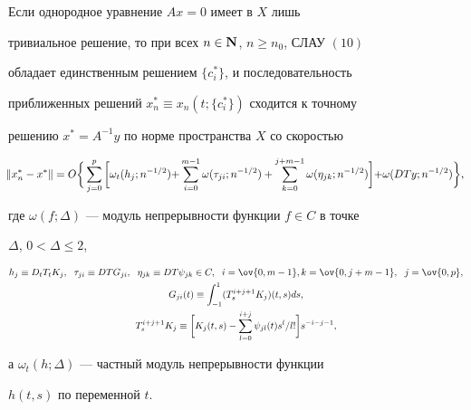 \begin{thm} 


Если однородное уравнение $Ax=0$ имеет в $X$ лишь 


тривиальное решение, то при всех $n\in\bold N$, $n\ge n_0$, СЛАУ $(10)$ 


обладает единственным решением $\{c^*_i\}$, и последовательность 


приближенных решений $x^*_n\equiv x_n(t;\{c^*_i\})$ сходится к точному 


решению $x^*=A^{-1}y$ по норме пространства $X$ со скоростью 


\begin{equation} 


\negthickspace\|x^*_n-x^*\|=


O\bigg\{\sum^p_{j=0}\bigg[\omega_t(h_j;n^{-1/2}){+} 


\sum^{m-1}_{i=0}\omega(\tau_{j i};n^{-1/2})+\sum^{j+m-1}_{k=0} 


\omega(\eta_{j k};n^{-1/2})\bigg]{+}\omega(D T y;n^{-1/2})\bigg\}, 


\end{equation} 


где $\omega(f;\Delta)$ --- модуль непрерывности функции $f\in C$ в точке 


$\Delta$, $0<\Delta\le2$, 


\begin{gather*} 


h_j\equiv D_t T_t K_j,\ \; \tau_{j i}\equiv D T G_{j i},\ \; 


\eta_{j k}\equiv D T\psi_{j k}\in C,\ \; i=\ov{0,m-1}, 


k=\ov{0,j+m-1},\ \; j=\ov{0,p},\\ 


G_{j i}(t)\equiv\int^1_{-1}(T^{i+j+1}_s K_j)(t,s)d s, \\ 


T^{i+j+1}_s K_j\equiv\bigg[K_j(t,s)-\sum^{i+j}_{l=0} 


\psi_{j l}(t)s^l/l!\bigg]s^{-i-j-1}, 


\end{gather*} 


а $\omega_t(h;\Delta)$ --- частный модуль непрерывности функции 


$h(t,s)$ по переменной $t$. 


\end{thm} 


 


